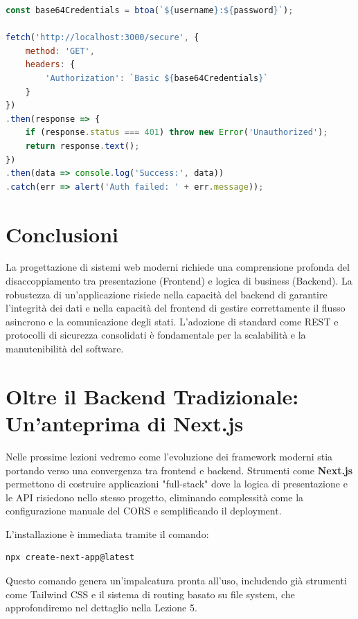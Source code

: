 \documentclass[11pt,a4paper]{report}
\begin{document}
\begin{lstlisting}[language=javascript, caption=Fetch con Basic Auth dinamica]
const base64Credentials = btoa(`${username}:${password}`);

fetch('http://localhost:3000/secure', {
    method: 'GET',
    headers: {
        'Authorization': `Basic ${base64Credentials}`
    }
})
.then(response => {
    if (response.status === 401) throw new Error('Unauthorized');
    return response.text();
})
.then(data => console.log('Success:', data))
.catch(err => alert('Auth failed: ' + err.message));
\end{lstlisting}

\section{Conclusioni}
La progettazione di sistemi web moderni richiede una comprensione profonda del disaccoppiamento tra presentazione (Frontend) e logica di business (Backend). La robustezza di un'applicazione risiede nella capacità del backend di garantire l'integrità dei dati e nella capacità del frontend di gestire correttamente il flusso asincrono e la comunicazione degli stati. L'adozione di standard come REST e protocolli di sicurezza consolidati è fondamentale per la scalabilità e la manutenibilità del software.

\section*{Oltre il Backend Tradizionale: Un'anteprima di Next.js}
Nelle prossime lezioni vedremo come l'evoluzione dei framework moderni stia portando verso una convergenza tra frontend e backend. Strumenti come \textbf{Next.js} permettono di costruire applicazioni "full-stack" dove la logica di presentazione e le API risiedono nello stesso progetto, eliminando complessità come la configurazione manuale del CORS e semplificando il deployment.

L'installazione è immediata tramite il comando:
\begin{lstlisting}[language=bash]
npx create-next-app@latest
\end{lstlisting}
Questo comando genera un'impalcatura pronta all'uso, includendo già strumenti come Tailwind CSS e il sistema di routing basato su file system, che approfondiremo nel dettaglio nella Lezione 5.
\end{document}
